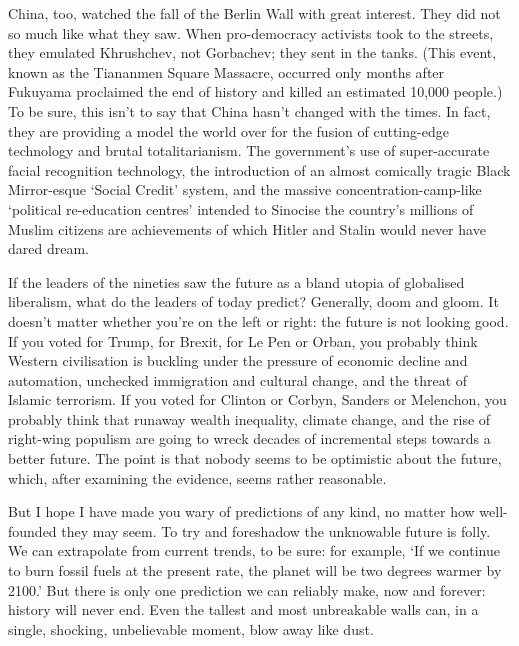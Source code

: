    China, too, watched the fall of the Berlin Wall with great interest.
   They did not so much like what they saw. When pro-democracy activists
   took to the streets, they emulated Khrushchev, not Gorbachev; they sent
   in the tanks. (This event, known as the Tiananmen Square Massacre,
   occurred only months after Fukuyama proclaimed the end of history and
   killed an estimated 10,000 people.) To be sure, this isn't to say that
   China hasn't changed with the times. In fact, they are providing a
   model the world over for the fusion of cutting-edge technology and
   brutal totalitarianism. The government's use of super-accurate facial
   recognition technology, the introduction of an almost comically tragic
   Black Mirror-esque `Social Credit' system, and the massive
   concentration-camp-like `political re-education centres' intended to
   Sinocise the country's millions of Muslim citizens are achievements of
   which Hitler and Stalin would never have dared dream.

   If the leaders of the nineties saw the future as a bland utopia of
   globalised liberalism, what do the leaders of today predict? Generally,
   doom and gloom. It doesn't matter whether you're on the left or right:
   the future is not looking good. If you voted for Trump, for Brexit, for
   Le Pen or Orban, you probably think Western civilisation is buckling
   under the pressure of economic decline and automation, unchecked
   immigration and cultural change, and the threat of Islamic terrorism.
   If you voted for Clinton or Corbyn, Sanders or Melenchon, you probably
   think that runaway wealth inequality, climate change, and the rise of
   right-wing populism are going to wreck decades of incremental steps
   towards a better future. The point is that nobody seems to be
   optimistic about the future, which, after examining the evidence, seems
   rather reasonable.

   But I hope I have made you wary of predictions of any kind, no matter
   how well-founded they may seem. To try and foreshadow the unknowable
   future is folly. We can extrapolate from current trends, to be sure:
   for example, `If we continue to burn fossil fuels at the present rate,
   the planet will be two degrees warmer by 2100.' But there is only one
   prediction we can reliably make, now and forever: history will never
   end. Even the tallest and most unbreakable walls can, in a single,
   shocking, unbelievable moment, blow away like dust.

